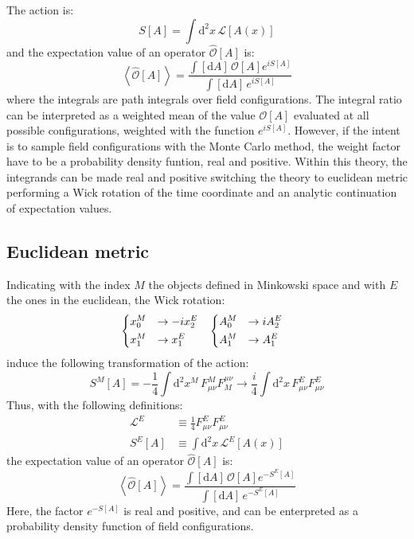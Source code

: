 The action is: \[ S[A] = \int \mathrm d^2x\, \mathcal L[A(x)] \] and the expectation value of an operator $\widehat{\mathcal O}[A]$ is:
\[
    \left< \widehat{\mathcal O}[A] \right> = \frac{\int[\mathrm dA]\, \mathcal O[A] e^{iS[A]}}{\int[\mathrm dA]\,e^{iS[A]}}
\]
where the integrals are path integrals over field configurations.
The integral ratio can be interpreted as a weighted mean of the value $\mathcal O[A]$ evaluated at all possible configurations, weighted with the function $e^{iS[A]}$.
However, if the intent is to sample field configurations with the Monte Carlo method, the weight factor have to be a probability density funtion, \ie real and positive.
Within this theory, the integrands can be made real and positive
switching the theory to euclidean metric performing a Wick rotation of the time coordinate and an analytic continuation of expectation values.

\subsection*{Euclidean metric}

Indicating with the index $M$ the objects defined in Minkowski space and with $E$ the ones in the euclidean, the Wick rotation:
\begin{align*}
    &\begin{dcases}
        x_0^M &\rightarrow -i x_2^E \\
        x_1^M &\rightarrow x_1^E
    \end{dcases}%
    &%
    \begin{dcases}
        A^M_0 &\rightarrow i A^E_2 \\
        A^M_1 &\rightarrow A^E_1 
    \end{dcases}&
\end{align*}
induce the following transformation of the action:
\[
    S^M[A] = -\frac{1}{4}\int\mathrm d^2x^M\,F^M_{\mu\nu}F_M^{\mu\nu} \rightarrow  \frac{i}{4}\int\mathrm d^2x\,F^E_{\mu\nu}F^E_{\mu\nu}
\]
Thus, with the following definitions:
\begin{equation}\label{eq:cont_action}
    \begin{aligned}
        \mathcal L^E &\equiv \frac{1}{4}F^E_{\mu\nu}F^E_{\mu\nu} \\
        S^E[A] &\equiv \int\mathrm d^2x\,\mathcal L^E[A(x)]
    \end{aligned}
\end{equation}
the expectation value of an operator $\widehat{\mathcal O}[A]$ is:
\begin{equation}\label{eq:cont_exp}
    \left< \widehat{\mathcal O}[A] \right> = \frac{\int[\mathrm dA]\, \mathcal O[A] e^{-S^E[A]}}{\int[\mathrm dA]\,e^{-S^E[A]}}
\end{equation}
Here, the factor $e^{-S[A]}$ is real and positive, and can be enterpreted as a probability density function of field configurations.

